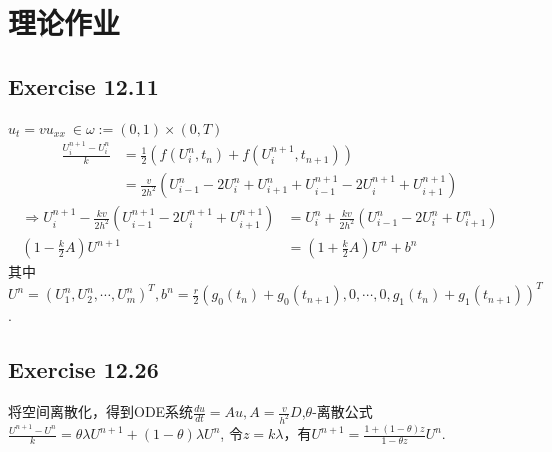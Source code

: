 \documentclass[UTF8]{ctexart}
\begin{document}
\pagestyle{fancy}
\fancyhead{}
\rhead{\today}



\section*{理论作业}
\subsection*{Exercise 12.11}
$u_t = vu_{xx}\ \in \omega := (0,1)\times(0,T)$
\begin{equation}
    \begin{aligned}
        \frac{U_i^{n+1}-U_i^n}{k} &= \frac{1}{2}(f(U_i^n, t_n)+f(U_i^{n+1},t_{n+1})) \\
                                  &= \frac{v}{2h^2}(U^n_{i-1} - 2U_i^n + U^n_{i+1}
                                                  + U_{i-1}^{n+1} - 2U_i^{n+1} + U_{i+1}^{n+1})
    \end{aligned}
\end{equation}
\begin{equation}
    \begin{aligned}
        \Rightarrow U_i^{n+1} - \frac{kv}{2h^2}(U^{n+1}_{i-1} - 2U_i^{n+1} + U_{i+1}^{n+1}) 
                 &= U_i^n + \frac{kv}{2h^2}(U^n_{i-1} - 2U_i^n + U^n_{i+1}) \\
                 (1 - \frac{k}{2}A)U^{n+1} &= (1 + \frac{k}{2}A)U^n + b^n
    \end{aligned}
\end{equation}
其中$U^n = (U_1^n, U_2^n, \cdots, U_m^n)^T, b^n = \frac{r}{2}(g_0(t_n)+g_0(t_{n+1}), 0, \cdots, 0, g_1(t_n)+g_1(t_{n+1}))^T$.

\subsection*{Exercise 12.26}
将空间离散化，得到ODE系统$\frac{du}{dt} = Au, A=\frac{v}{h^2}D$,$\theta$-离散公式$\frac{U^{n+1}-U^n}{k} = \theta\lambda U^{n+1} + (1-\theta)\lambda U^n$,
令$z=k\lambda$，有$U^{n+1} = \frac{1 + (1-\theta)z}{1-\theta z}U^n$.
\end{document}
